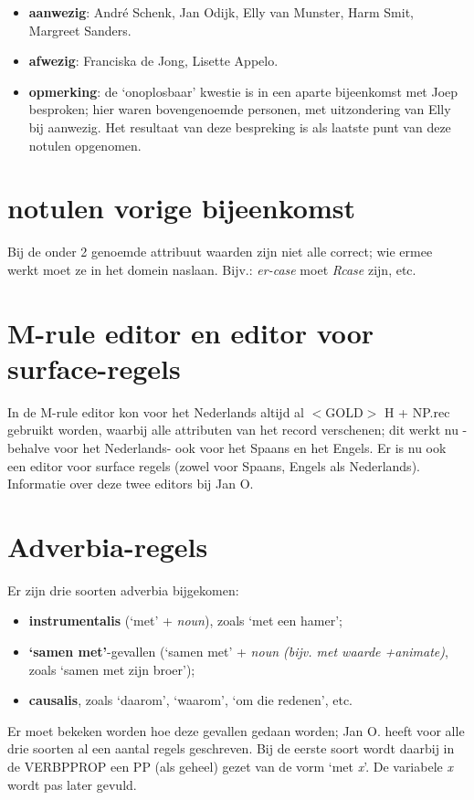 
   \RosDate{\today}
   \RosSupersedes{-}
   \MakeRosTitle
\begin{itemize}
  \item {\bf aanwezig}: Andr\'{e} Schenk, Jan Odijk, Elly van Munster, 
             Harm Smit, Margreet Sanders.
  \item {\bf afwezig}: Franciska de Jong, Lisette Appelo.
  \item {\bf opmerking}: de `onoplosbaar' kwestie is in een 
aparte bijeenkomst met Joep besproken; hier waren bovengenoemde personen, 
met uitzondering van Elly bij aanwezig. Het resultaat van deze bespreking is 
als laatste punt van deze notulen opgenomen.
\end{itemize}

\section {notulen vorige bijeenkomst}

Bij de onder 2 genoemde attribuut waarden zijn niet alle correct; wie 
ermee werkt 
moet ze in het domein naslaan. Bijv.: {\em er-case} moet {\em Rcase} zijn, etc.

\section {M-rule editor en editor voor surface-regels}

In de M-rule editor kon voor het Nederlands altijd al $<$GOLD$>$ H + NP.rec 
gebruikt worden, waarbij alle attributen van het record verschenen; dit 
werkt nu -behalve voor het Nederlands- ook voor het Spaans en het Engels.
Er is nu ook een editor voor surface regels (zowel voor Spaans, Engels als 
Nederlands). Informatie over deze twee editors bij Jan O.

\section {Adverbia-regels}

Er zijn drie soorten adverbia bijgekomen:
\begin{itemize}
   \item {\bf instrumentalis} (`met' + {\em noun}), zoals `met een hamer';
   \item {\bf `samen met'}-gevallen (`samen met' + {\em noun (bijv. met waarde 
          +animate)}, zoals `samen met zijn broer');
   \item {\bf causalis}, zoals `daarom', `waarom', `om die redenen', etc.
\end{itemize}
Er moet bekeken worden hoe deze gevallen gedaan worden; Jan O. heeft voor alle 
drie soorten al een aantal regels geschreven. Bij de eerste soort wordt daarbij
in de VERBPPROP een PP (als geheel) gezet van de vorm `met {\em x}'. De 
variabele {\em x} wordt pas later gevuld. 

